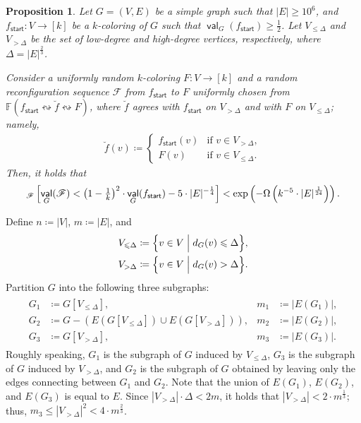 \documentclass[11pt,fleqn]{article}
\renewcommand{\geq}{\geqslant}
\renewcommand{\leq}{\leqslant}
\newcommand{\reco}{\leftrightsquigarrow}
\newcommand{\defeq}{\coloneq}
\DeclareMathOperator{\val}{\mathsf{val}}
\newcommand{\sss}{\mathsf{start}}
\newcommand{\f}{f}
\newcommand{\frnd}{F}
\newcommand{\sqcol}{\scrF}
\newcommand{\stsqcol}{\bbF}
\newcommand{\Vl}{V_{\leq \Delta}}
\newcommand{\Vg}{V_{> \Delta}}
\newcommand{\bbF}{\mathbb{F}}
\newcommand{\scrF}{\mathscr{F}}
\let\Pr\relax\DeclareMathOperator*{\Pr}{\mathbb{P}}
\newtheorem{proposition}[theorem]{Proposition}
\theoremstyle{definition}
\numberwithin{equation}{section}
\begin{document}
\begin{proposition}
\label{prp:Cut-alg:high-prob}
    Let $G=(V,E)$ be a simple graph such that $|E| \geq 10^6$, and
    $\f_\sss \colon V \to [k]$ be a $k$-coloring of $G$ such that
    $\val_G(\f_\sss) \geq \frac{1}{2}$.
    Let
    $\Vl$ and $\Vg$ be the set of low-degree and high-degree vertices, respectively,
    where $\Delta = |E|^\frac{2}{3}$.

    Consider a uniformly random $k$-coloring $\frnd \colon V \to [k]$ and
    a random reconfiguration sequence $\sqcol$ from $\f_\sss$ to $\frnd$
    uniformly chosen from $\stsqcol(\f_\sss \reco \breve{\f} \reco \frnd)$, where
    $\breve{\f}$ agrees
    with $\f_\sss$ on $\Vg$ and
    with $\frnd$ on $\Vl$; namely,
    \begin{align}
        \breve{\f}(v) \defeq
        \begin{cases}
            \f_\sss(v) & \text{if } v \in \Vg, \\
            \frnd(v) & \text{if } v \in \Vl.
        \end{cases}
    \end{align}
    Then, it holds that
    \begin{align}
        \Pr_{\sqcol}\left[
            \val_G(\sqcol)
            < \left(1-\tfrac{1}{k}\right)^2 \cdot \val_G(\f_\sss) - 5 \cdot |E|^{-\frac{1}{4}}
        \right]
        < \exp\left(- \Omega\left(k^{-5} \cdot |E|^{\frac{1}{24}}\right)\right).
    \end{align}
\end{proposition}

Define
$n \defeq |V|$,
$m \defeq |E|$, and
\begin{align}
\label{eq:Cut-alg:Vl-Vg}
\begin{aligned}
    \Vl \defeq \Bigl\{ v \in V \Bigm| d_G(v) \leq \Delta \Bigr\}, \\
    \Vg \defeq \Bigl\{ v \in V \Bigm| d_G(v) > \Delta \Bigr\}.
\end{aligned}
\end{align}
Partition $G$ into the following three subgraphs:
\begin{align}
\begin{aligned}
    G_1 & \defeq G[\Vl],
        & m_1 & \defeq |E(G_1)|, \\
    G_2 & \defeq G - (E(G[\Vl]) \cup E(G[\Vg])),
        & m_2 & \defeq |E(G_2)|, \\
    G_3 & \defeq G[\Vg],
        & m_3 & \defeq |E(G_3)|.
\end{aligned}
\end{align}
Roughly speaking,
$G_1$ is the subgraph of $G$ induced by $\Vl$,
$G_3$ is the subgraph of $G$ induced by $\Vg$, and
$G_2$ is the subgraph of $G$ obtained by leaving only the edges connecting between $G_1$ and $G_2$.
Note that the union of $E(G_1)$, $E(G_2)$, and $E(G_3)$ is equal to $E$.
Since $|\Vg| \cdot \Delta < 2m$,
it holds that $|\Vg| < 2\cdot m^{\frac{1}{3}}$; thus,
$m_3 \leq |\Vg|^2 < 4 \cdot m^{\frac{2}{3}}$.
\end{document}
